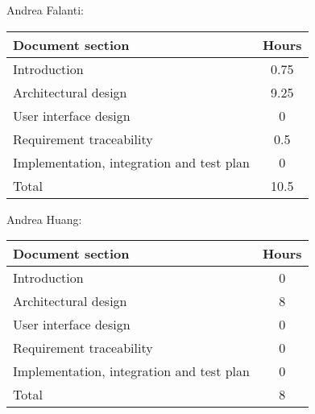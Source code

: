 Andrea Falanti:

\begin{tabular}{|l|c|}
    \hline
    Document section & Hours \\
    \hline
     Introduction & 0.75\\
     Architectural design & 9.25\\
     User interface design & 0\\
     Requirement traceability & 0.5\\
     Implementation, integration and test plan & 0\\
     \hline
     Total & 10.5\\
     \hline
\end{tabular}
\vskip 0.3in

Andrea Huang:

\begin{tabular}{|l|c|}
    \hline
    Document section & Hours \\
    \hline
     Introduction & 0\\
     Architectural design & 8\\
     User interface design & 0\\
     Requirement traceability & 0\\
     Implementation, integration and test plan & 0\\
     \hline
     Total & 8\\
     \hline
\end{tabular}